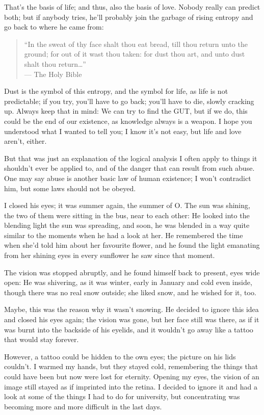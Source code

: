 That's the basis of life; and thus, also the basis of love. 
Nobody really can predict both; but if anybody tries, he'll probably join the garbage of rising entropy and go back to where he came from:
\begin{quote}
\enquote{In the sweat of thy face shalt thou eat bread, till thou return unto the ground; for out of it wast thou taken: for dust thou art, and unto dust shalt thou return\ldots}\\
--- The Holy Bible
\end{quote}
Dust is the symbol of this entropy, and the symbol for life, as life is not predictable; if you try, you'll have to go back; you'll have to die, slowly cracking up. 
Always keep that in mind: We can try to find the GUT, but if we do, this could be the end of our existence, as knowledge always is a weapon. 
I hope you understood what I wanted to tell you; I know it's not easy, but life and love aren't, either.

But that was just an explanation of the logical analysis I often apply to things it shouldn't ever be applied to, and of the danger that can result from such abuse. 
One may say abuse is another basic law of human existence; I won't contradict him, but some laws should not be obeyed.

I closed his eyes; it was summer again, the summer of O. The sun was shining, the two of them were sitting in the bus, near to each other: He looked into the blending light the sun was spreading, and soon, he was blended in a way quite similar to the moments when he had a look at her. He remembered the time when she'd told him about her favourite flower, and he found the light emanating from her shining eyes in every sunflower he saw since that moment.

The vision was stopped abruptly, and he found himself back to present, eyes wide open: He was shivering, as it was winter, early in January and cold even inside, though there was no real snow outside; she liked snow, and he wished for it, too.

Maybe, this was the reason why it wasn't snowing. 
He decided to ignore this idea and closed his eyes again; the vision was gone, but her face still was there, as if it was burnt into the backside of his eyelids, and it wouldn't go away like a tattoo that would stay forever.

However, a tattoo could be hidden to the own eyes; the picture on his lids couldn't. 
I warmed my hands, but they stayed cold, remembering the things that could have been but now were lost for eternity. 
Opening my eyes, the vision of an image still stayed as if imprinted into the retina. I decided to ignore it and had a look at some of the things I had to do for university, but concentrating was becoming more and more difficult in the last days.

